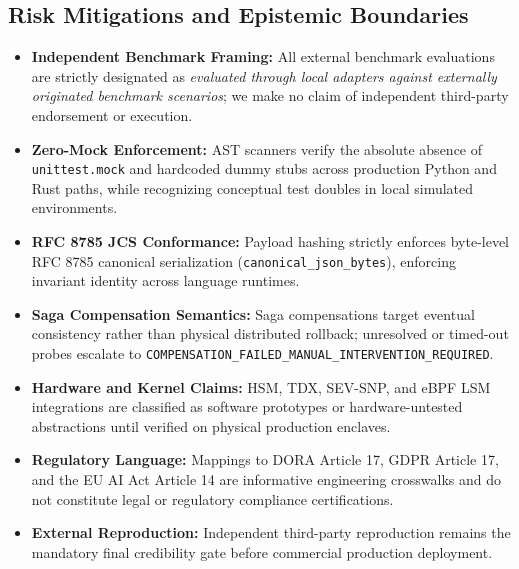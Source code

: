 \documentclass[10pt,journal,compsoc]{IEEEtran}
\begin{document}
\subsection{Risk Mitigations and Epistemic Boundaries}
\begin{itemize}
    \item \textbf{Independent Benchmark Framing:} All external benchmark evaluations are strictly designated as \emph{evaluated through local adapters against externally originated benchmark scenarios}; we make no claim of independent third-party endorsement or execution.
    \item \textbf{Zero-Mock Enforcement:} AST scanners verify the absolute absence of \texttt{unittest.mock} and hardcoded dummy stubs across production Python and Rust paths, while recognizing conceptual test doubles in local simulated environments.
    \item \textbf{RFC 8785 JCS Conformance:} Payload hashing strictly enforces byte-level RFC 8785 canonical serialization (\texttt{canonical\_json\_bytes}), enforcing invariant identity across language runtimes.
    \item \textbf{Saga Compensation Semantics:} Saga compensations target eventual consistency rather than physical distributed rollback; unresolved or timed-out probes escalate to \texttt{COMPENSATION\_FAILED\_MANUAL\_INTERVENTION\_REQUIRED}.
    \item \textbf{Hardware and Kernel Claims:} HSM, TDX, SEV-SNP, and eBPF LSM integrations are classified as software prototypes or hardware-untested abstractions until verified on physical production enclaves.
    \item \textbf{Regulatory Language:} Mappings to DORA Article 17, GDPR Article 17, and the EU AI Act Article 14 are informative engineering crosswalks and do not constitute legal or regulatory compliance certifications.
    \item \textbf{External Reproduction:} Independent third-party reproduction remains the mandatory final credibility gate before commercial production deployment.
\end{itemize}
\end{document}
